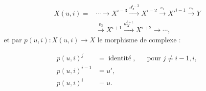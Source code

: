 \begin{equation}
\begin{aligned}
X(u,i)={}&\cdots\longrightarrow X^{i-3}
\xrightarrow{d_X^{i-3}}X^{i-2}
\xrightarrow{v_1}X'^{i-1}
\xrightarrow{v_2}Y\\
&\xrightarrow{v_3}X^{i+1}
\xrightarrow{d_X^{i+1}}X^{i+2}\longrightarrow\cdots,
\end{aligned}
\tag{2.1.1.2}
\end{equation}
et par $p(u,i)\colon X(u,i)\longrightarrow X$ le morphisme de
complexe :

\begin{equation}
\begin{aligned}
p(u,i)^j&=\operatorname{identité},
  &&\text{pour }j\neq i-1,i,\\
p(u,i)^{i-1}&=u',\\
p(u,i)^i&=u.
\end{aligned}
\tag{2.1.1.3}
\end{equation}
\endgroup
